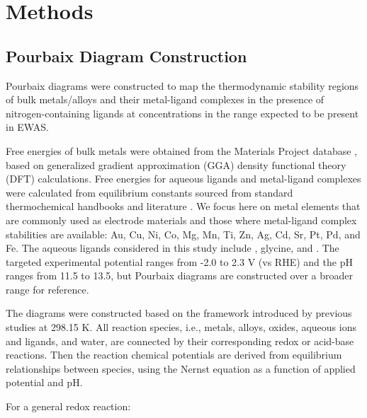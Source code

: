 \documentclass[journal=jacsat,manuscript=article]{achemso}
\begin{document}
\section{Methods}
\subsection{Pourbaix Diagram Construction}
Pourbaix diagrams were constructed to map the thermodynamic stability regions of bulk metals/alloys and their metal-ligand complexes in the presence of nitrogen-containing ligands at concentrations in the range expected to be present in EWAS.

Free energies of bulk metals were obtained from the Materials Project database \cite{Jain2013TheInnovation}, based on generalized gradient approximation (GGA) density functional theory (DFT) calculations. Free energies for aqueous ligands and metal-ligand complexes were calculated from equilibrium constants sourced from standard thermochemical handbooks \cite{Wagman1982TheUnits, Smith1989CriticalConstants, Bard2017StandardSolution, Bjerrum1957StabilitySubstances} and literature \cite{Meng1996PrinciplesReview, Azadi2019DataComplexes, Aviles2022ExploringNH3, Oraby2023SelectiveSolutions, Harrington2005DeterminationIon}. We focus here on metal elements that are commonly used as electrode materials and those where metal-ligand complex stabilities are available: Au, Cu, Ni, Co, Mg, Mn, Ti, Zn, Ag, Cd, Sr, Pt, Pd, and Fe. The aqueous ligands considered in this study include , glycine, and . The targeted experimental potential ranges from -2.0 to 2.3 V (vs RHE) and the pH ranges from 11.5 to 13.5, but Pourbaix diagrams are constructed over a broader range for reference.


The diagrams were constructed based on the framework introduced by previous studies \cite{PourbaixAtlasSolutions, Huang2017ImprovedCompounds,Huang2015ElectrochemicalCalculations,Singh2017ElectrochemicalMaterials,Patel2019EfficientCompounds,Persson2012PredictionStates, Ding2018ElectrochemicalStates, Thompson2011PourbaixSystems} at 298.15 K. All reaction species, i.e., metals, alloys, oxides, aqueous ions and ligands, and water, are connected by their corresponding redox or acid-base reactions. Then the reaction chemical potentials are derived from equilibrium relationships between species, using the Nernst equation as a function of applied potential and pH.

For a general redox reaction:
\end{document}

